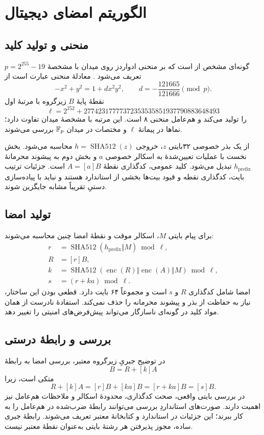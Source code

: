 \chapter{الگوریتم امضای دیجیتال }
\label{app:ed25519}
\section{منحنی و تولید کلید}
 گونه‌ای مشخص از  است که بر منحنی ادواردز روی میدان با مشخصۀ $p=2^{255}-19$ تعریف می‌شود \cite{ed25519}. معادلۀ منحنی عبارت است از
\begin{equation}
-x^2+y^2=1+dx^2y^2,\qquad
d=-\frac{121665}{121666}\pmod p.
\end{equation}
نقطۀ پایۀ $B$ زیرگروه با مرتبۀ اول
\begin{equation}
\ell=2^{252}+27742317777372353535851937790883648493
\end{equation}
را تولید می‌کند و هم‌عامل منحنی ۸ است. این مرتبه با مشخصۀ میدان تفاوت دارد؛ نماها در پیمانۀ $\ell$ و مختصات در میدان $\mathbb{F}_p$ بررسی می‌شوند.

از یک بذر خصوصی ۳۲بایتی $z$، خروجی $h=\operatorname{SHA512}(z)$ محاسبه می‌شود. بخش نخست با عملیات تعیین‌شدۀ  به اسکالر خصوصی $a$ و بخش دوم به پیشوند محرمانۀ $h_{\mathrm{prefix}}$ تبدیل می‌شود. کلید عمومی، کدگذاری نقطۀ $A=[a]B$ است. جزئیات ترتیب بایت، کدگذاری نقطه و قیود بیت‌ها بخشی از استاندارد هستند و نباید با پیاده‌سازی دستیِ تقریباً مشابه جایگزین شوند.

\section{تولید امضا}
برای پیام بایتی $M$، اسکالر موقت و نقطۀ امضا چنین محاسبه می‌شوند:
\begin{align}
r&=\operatorname{SHA512}(h_{\mathrm{prefix}}\Vert M)\bmod\ell,\\
R&=[r]B,\\
k&=\operatorname{SHA512}(\operatorname{enc}(R)\Vert\operatorname{enc}(A)\Vert M)\bmod\ell,\\
s&=(r+ka)\bmod\ell.
\end{align}
امضا شامل کدگذاری $R$ و $s$ است و مجموعاً ۶۴ بایت دارد. قطعی بودن این ساختار، نیاز به حفاظت از بذر و پیشوند محرمانه را حذف نمی‌کند. استفادۀ نادرست از همان مواد کلید در گونه‌ای ناسازگار می‌تواند پیش‌فرض‌های امنیتی را تغییر دهد.

\section{بررسی و رابطۀ درستی}
در توضیح جبریِ زیرگروه معتبر، بررسی امضا به رابطۀ
\begin{equation}
[s]B=R+[k]A
\end{equation}
متکی است، زیرا
\begin{equation}
R+[k]A=[r]B+[ka]B=[r+ka]B=[s]B.
\end{equation}
در بررسی بایتی واقعی، صحت کدگذاری، محدودۀ اسکالر و ملاحظات هم‌عامل نیز اهمیت دارند. صورت‌های استانداردِ بررسی می‌توانند رابطۀ ضرب‌شده در هم‌عامل را به کار ببرند؛ این جزئیات در استاندارد و کتابخانۀ معتبر تعریف می‌شوند. رابطۀ جبری ساده، مجوز پذیرفتن هر رشتۀ بایتی به‌عنوان نقطۀ معتبر نیست.

